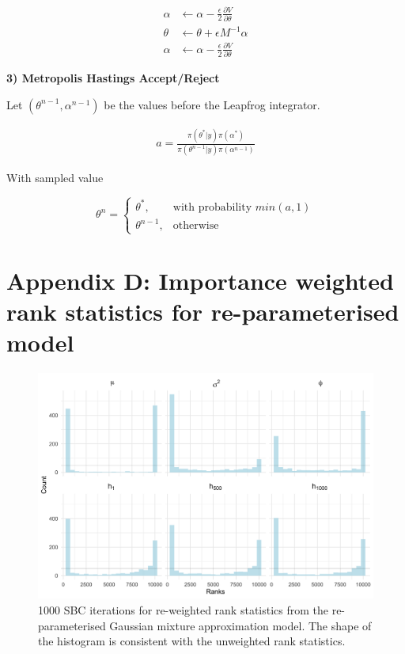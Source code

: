 \documentclass[12pt, a4paper]{article}
\begin{document}
$$
\begin{aligned}
\alpha &\leftarrow \alpha - \frac{\epsilon}{2} \frac{\partial V}{\partial \theta} \\
\theta &\leftarrow \theta + \epsilon M^{-1} \alpha \\
\alpha &\leftarrow \alpha - \frac{\epsilon}{2} \frac{\partial V}{\partial \theta}
\end{aligned}
$$

\textbf{3) Metropolis Hastings Accept/Reject}

Let $(\theta^{n-1}, \alpha^{n-1})$ be the values before the Leapfrog integrator.

$$
\begin{aligned}
a = \frac{\pi(\theta^{\ast} | y) \pi(\alpha^{\ast})}{\pi(\theta^{n-1} | y) \pi(\alpha^{n-1})}
\end{aligned}
$$

With sampled value

$$
\theta^n = \begin{cases}
    \theta^{\ast},& \text{with probability } min(a,1)\\
    \theta^{n-1}, & \text{otherwise}
\end{cases}
$$

\section{Appendix D: Importance weighted rank statistics for re-parameterised model}

\begin{figure}[H]
    \centering
    \includegraphics[scale=0.09]{results/weighted_ksc_ncp_1k.png}
    \caption{1000 SBC iterations for re-weighted rank statistics from the re-parameterised Gaussian mixture approximation model. The shape of the histogram is consistent with the unweighted rank statistics.}
    \label{fig:ncpreweight1k}
\end{figure}
\end{document}
